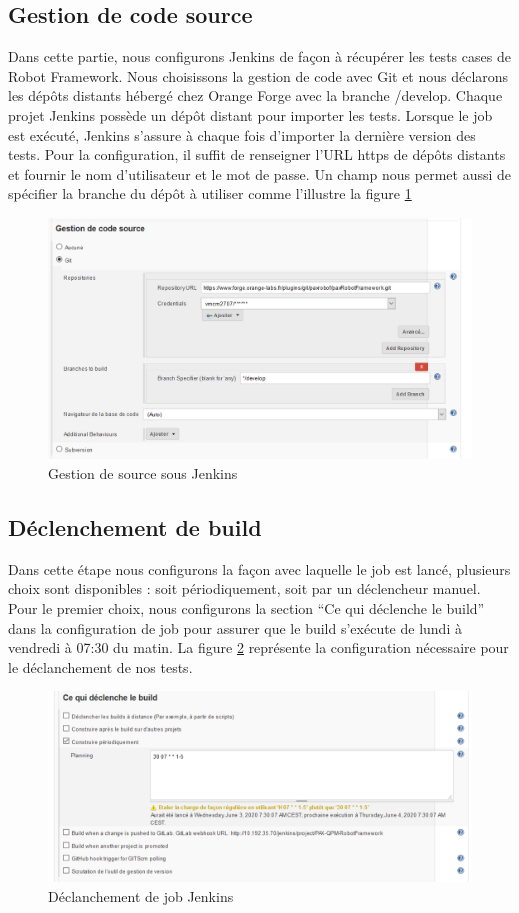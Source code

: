\subsection{Gestion de code source}
Dans cette partie, nous configurons Jenkins de façon à récupérer les tests cases de Robot Framework. Nous choisissons la gestion de code avec Git et nous déclarons les dépôts distants hébergé chez Orange Forge avec la branche /develop. Chaque projet Jenkins possède un dépôt distant pour importer les tests. Lorsque le job est exécuté, Jenkins s’assure à chaque fois d’importer la dernière version des tests. Pour la configuration, il suffit de renseigner l’URL https de dépôts distants et fournir le nom d’utilisateur et le mot de passe. Un champ nous permet aussi de spécifier la branche du dépôt à utiliser comme l'illustre la figure \ref{fig:source-jenkins}
\begin{figure}[H]
	\centering
	\includegraphics[width=0.9\linewidth]{img/jenkins/source}
	\caption[Gestion de source sous Jenkins]{Gestion de source sous Jenkins}
	\label{fig:source-jenkins}
\end{figure}

\subsection{Déclenchement de build }
Dans cette étape nous configurons la façon avec laquelle le job est lancé, plusieurs choix sont disponibles : soit périodiquement, soit par un déclencheur manuel.\\
Pour le premier choix, nous configurons la section “Ce qui déclenche le build” dans la configuration de job pour assurer que le build s'exécute de lundi à vendredi à 07:30 du matin.
La figure \ref{fig:declanchement} représente la configuration nécessaire pour le déclanchement de nos tests.
\begin{figure}[H]
	\centering
	\includegraphics[width=0.8\linewidth]{img/jenkins/declanchement}
	\caption[Déclanchement de job Jenkins]{Déclanchement de job Jenkins}
	\label{fig:declanchement}
\end{figure}

